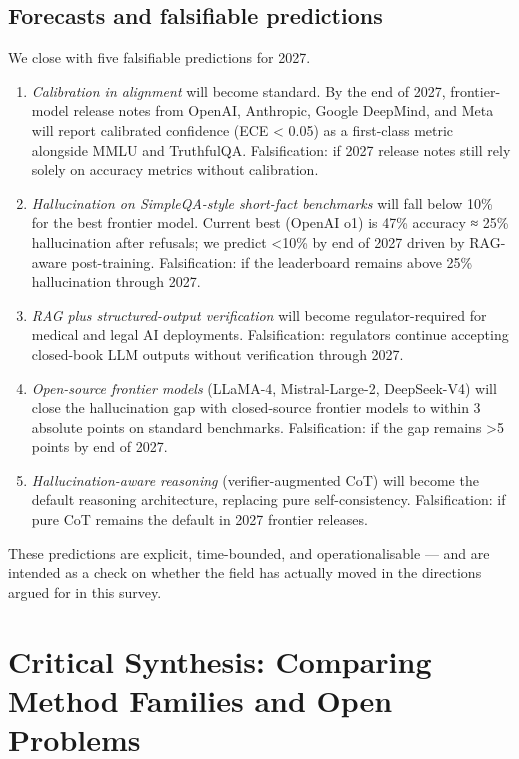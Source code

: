 \documentclass{article}
\begin{document}
\subsection{Forecasts and falsifiable predictions}\label{forecasts-and-falsifiable-predictions}

We close with five falsifiable predictions for 2027.

\begin{enumerate}
\def\labelenumi{(\arabic{enumi})}
\item
  \emph{Calibration in alignment} will become standard. By the end of 2027, frontier-model release notes from OpenAI, Anthropic, Google DeepMind, and Meta will report calibrated confidence (ECE \textless{} 0.05) as a first-class metric alongside MMLU and TruthfulQA. Falsification: if 2027 release notes still rely solely on accuracy metrics without calibration.
\item
  \emph{Hallucination on SimpleQA-style short-fact benchmarks} will fall below 10\% for the best frontier model. Current best (OpenAI o1) is 47\% accuracy ≈ 25\% hallucination after refusals; we predict \textless10\% by end of 2027 driven by RAG-aware post-training. Falsification: if the leaderboard remains above 25\% hallucination through 2027.
\item
  \emph{RAG plus structured-output verification} will become regulator-required for medical and legal AI deployments. Falsification: regulators continue accepting closed-book LLM outputs without verification through 2027.
\item
  \emph{Open-source frontier models} (LLaMA-4, Mistral-Large-2, DeepSeek-V4) will close the hallucination gap with closed-source frontier models to within 3 absolute points on standard benchmarks. Falsification: if the gap remains \textgreater5 points by end of 2027.
\item
  \emph{Hallucination-aware reasoning} (verifier-augmented CoT) will become the default reasoning architecture, replacing pure self-consistency. Falsification: if pure CoT remains the default in 2027 frontier releases.
\end{enumerate}

These predictions are explicit, time-bounded, and operationalisable --- and are intended as a check on whether the field has actually moved in the directions argued for in this survey.

\section{Critical Synthesis: Comparing Method Families and Open Problems}\label{critical-synthesis-comparing-method-families-and-open-problems}
\end{document}
